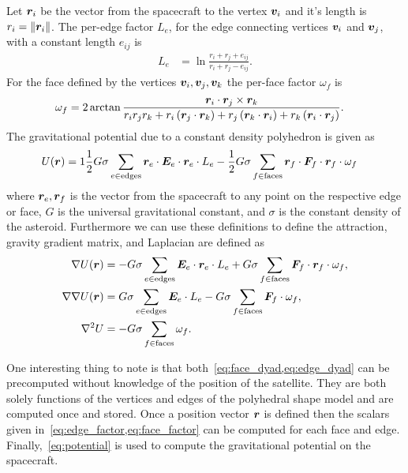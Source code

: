 \documentclass[]{aiaa-tc}%
\begin{document}
Let \( \bm{r}_i \) be the vector from the spacecraft to the vertex \( \bm{v}_i \) and it's length is \( r_i = \left\| \bm{r}_i \right\| \).
The per-edge factor \( L_e \), for the edge connecting vertices \( \bm{v}_i \) and \( \bm{v}_j \), with a constant length \( e_{ij} \) is
\begin{align}\label{eq:edge_factor}
	L_e &= \ln \frac{r_i + r_j + e_{ij}}{r_i + r_j - e_{ij}}.
\end{align}
For the face defined by the vertices \( \bm{v}_i, \bm{v}_j, \bm{v}_k \) the per-face factor \( \omega_f \) is
\begin{align}\label{eq:face_factor}
	\omega_f &= 2 \arctan \frac{\bm{r}_i \cdot \bm{r}_j \times \bm{r}_k}{r_i r_j r_k + r_i \left( \bm{r}_j \cdot \bm{r}_k \right) + r_j \left( \bm{r}_k \cdot \bm{r}_i \right) + r_k \left( \bm{r}_i \cdot \bm{r}_j \right)} .
\end{align}
The gravitational potential due to a constant density polyhedron is given as
\begin{align}\label{eq:potential}
	U(\bm{r}) &= 1\frac{1}{2} G \sigma \sum_{e \in \text{edges}} \bm{r}_e \cdot \bm{E}_e \cdot \bm{r}_e \cdot L_e - \frac{1}{2}G \sigma \sum_{f \in \text{faces}} \bm{r}_f \cdot \bm{F}_f \cdot \bm{r}_f \cdot \omega_f
\end{align}
where \( \bm{r}_e, \bm{r}_f \) is the vector from the spacecraft to any point on the respective edge or face, \( G\) is the universal gravitational constant, and \( \sigma \) is the constant density of the asteroid.
Furthermore we can use these definitions to define the attraction, gravity gradient matrix, and Laplacian are defined as
\begin{align}
	\nabla U ( \bm{r} ) &= -G \sigma \sum_{e \in \text{edges}} \bm{E}_e \cdot \bm{r}_e \cdot L_e + G \sigma \sum_{f \in \text{faces}} \bm{F}_f \cdot \bm{r}_f \cdot \omega_f , \label{eq:attraction}\\
	\nabla \nabla U ( \bm{r} ) &= G \sigma \sum_{e \in \text{edges}} \bm{E}_e  \cdot L_e - G \sigma \sum_{f \in \text{faces}} \bm{F}_f \cdot \omega_f , \label{eq:gradient_matrix}\\
	\nabla^2 U &= -G \sigma \sum_{f \in \text{faces}}  \omega_f \label{eq:laplacian}.
\end{align}

One interesting thing to note is that both~\cref{eq:face_dyad,eq:edge_dyad} can be precomputed without knowledge of the position of the satellite.
They are both solely functions of the vertices and edges of the polyhedral shape model and are computed once and stored.
Once a position vector \( \bm{r} \) is defined then the scalars given in~\cref{eq:edge_factor,eq:face_factor} can be computed for each face and edge.
Finally,~\cref{eq:potential} is used to compute the gravitational potential on the spacecraft.
\end{document}

